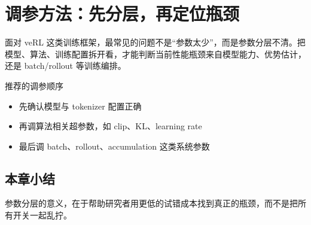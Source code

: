\section{调参方法：先分层，再定位瓶颈}
面对 veRL 这类训练框架，最常见的问题不是“参数太少”，而是参数分层不清。把模型、算法、训练配置拆开看，才能判断当前性能瓶颈来自模型能力、优势估计，还是 batch/rollout 等训练编排。

\begin{knowledgebox}{推荐的调参顺序}
\begin{itemize}
  \item 先确认模型与 tokenizer 配置正确
  \item 再调算法相关超参数，如 clip、KL、learning rate
  \item 最后调 batch、rollout、accumulation 这类系统参数
\end{itemize}
\end{knowledgebox}

\subsection{本章小结}
参数分层的意义，在于帮助研究者用更低的试错成本找到真正的瓶颈，而不是把所有开关一起乱拧。

\newpage
